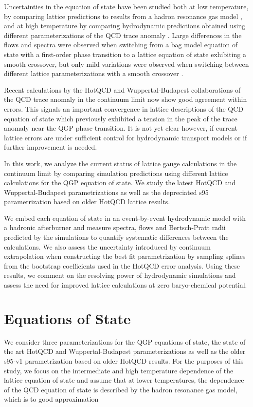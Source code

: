 \documentclass[aps,prc,reprint,amsmath,nofootinbib,superscriptaddress]{revtex4-1}
\begin{document}
Uncertainties in the equation of state have been studied both at low temperature, by comparing lattice predictions to results from a hadron resonance gas model
\cite{Huovinen:2009yb}, and at high temperature by comparing hydrodynamic predictions obtained using different parameterizations of the QCD trace anomaly 
\cite{Huovinen:2005gy, Huovinen:2009yb}. Large differences in the flows and spectra were observed when switching from a bag model equation of state with a first-order 
phase transition to a lattice equation of state exhibiting a smooth crossover, but only mild variations were observed when switching between different lattice 
parameterizations with a smooth crossover \cite{Huovinen:2009yb}.

Recent calculations by the HotQCD and Wuppertal-Budapest collaborations of the QCD trace anomaly in the continuum limit now show good agreement within errors. This signals an important
convergence in lattice descriptions of the QCD equation of state which previously exhibited a tension in the peak of the trace anomaly near the QGP phase transition. It is not yet clear however, if current
lattice errors are under sufficient control for hydrodynamic transport models or if further improvement is needed.  

In this work, we analyze the current status of lattice gauge calculations in the continuum limit by comparing simulation predictions using different lattice calculations for the QGP equation of state.
We study the latest HotQCD and Wuppertal-Budapest parametrizations as well as the depreciated s95 parametrization based on older HotQCD lattice results. 

We embed each equation of state in an event-by-event hydrodynamic model with a hadronic afterburner and measure spectra, flows and Bertsch-Pratt radii predicted by the simulations to quantify systematic 
differences between the calculations. We also assess the uncertainty introduced by continuum extrapolation when constructing the best fit parametrization by sampling splines from the bootstrap coefficients 
used in the HotQCD error analysis. Using these results, we comment on the resolving power of hydrodynamic simulations and assess the need for improved lattice calculations at zero baryo-chemical potential.

\section{Equations of State}

We consider three parameterizations for the QGP equations of state, the state of the art HotQCD and Wuppertal-Budapest parameterizations \cite{?} as well as the older s95-v1 parametrization based on 
older HotQCD results. For the purposes of this study, we focus on the intermediate and high temperature dependence of the lattice equation of state and assume that at lower temperatures, the dependence of the 
QCD equation of state is described by the hadron 
resonance gas model, which is to good approximation
\end{document}
